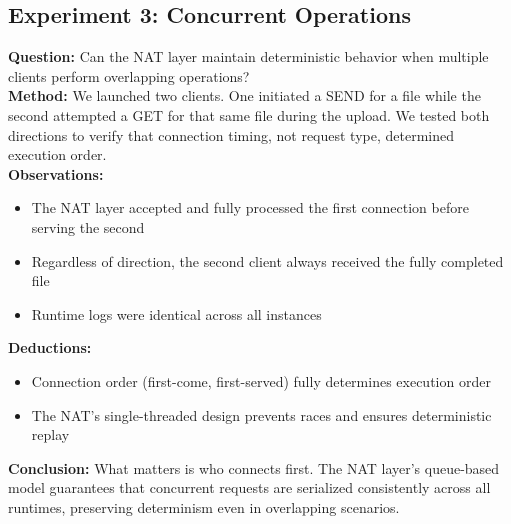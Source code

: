 \documentclass[10pt, 
]{IEEEtran}
\begin{document}
\subsection{Experiment 3: Concurrent Operations}
\textbf{Question:} Can the NAT layer maintain deterministic behavior when multiple clients perform overlapping operations? \\
\textbf{Method:} We launched two clients. One initiated a SEND for a file while the second attempted a GET for that same file during the upload. We tested both directions to verify that connection timing, not request type, determined execution order. \\
\textbf{Observations:}
\begin{itemize}
    \item The NAT layer accepted and fully processed the first connection before serving the second
    \item Regardless of direction, the second client always received the fully completed file
    \item Runtime logs were identical across all instances
\end{itemize}
\textbf{Deductions:}
\begin{itemize}
    \item Connection order (first-come, first-served) fully determines execution order
    \item The NAT's single-threaded design prevents races and ensures deterministic replay
\end{itemize}
\textbf{Conclusion:} What matters is who connects first. The NAT layer's queue-based model guarantees that concurrent requests are serialized consistently across all runtimes, preserving determinism even in overlapping scenarios.
\end{document}
